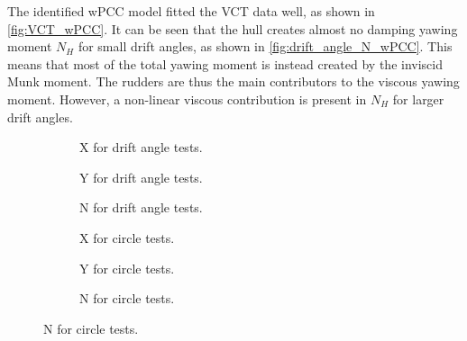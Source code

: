 The identified wPCC model fitted the VCT data well, as shown in \autoref{fig:VCT_wPCC}. 
It can be seen that the hull creates almost no damping yawing moment $N_H$ for small drift angles, as shown in \autoref{fig:drift_angle_N_wPCC}. This means that most of the total yawing moment is instead created by the inviscid Munk moment. The rudders are thus the main contributors to the viscous yawing moment. However, a non-linear viscous contribution is present in $N_H$ for larger drift angles. 
\begin{figure}[H]
     \centering
     \begin{subfigure}[b]{0.32\textwidth}
         \centering
        
        \caption{X for drift angle tests.}
        \label{fig:drift_angle_X_wPCC}
     \end{subfigure}
     \hfill
     \begin{subfigure}[b]{0.32\textwidth}
         \centering
         
        \caption{Y for drift angle tests.}
        \label{fig:drift_angle_Y_wPCC}
     \end{subfigure}
     \hfill
     \begin{subfigure}[b]{0.32\textwidth}
         \centering
         
        \caption{N for drift angle tests.}
        \label{fig:drift_angle_N_wPCC}
     \end{subfigure}
    \vfill
    
     \begin{subfigure}[b]{0.32\textwidth}
         \centering
         
        \caption{X for circle tests.}
        \label{fig:circle_X_wPCC}
     \end{subfigure}
     \hfill
     \begin{subfigure}[b]{0.32\textwidth}
         \centering
         
        \caption{Y for circle tests.}
        \label{fig:circle_Y_wPCC}
     \end{subfigure}
     \hfill
     \begin{subfigure}[b]{0.32\textwidth}
         \centering
         
        \caption{N for circle tests.}
        \label{fig:circle_N_wPCC}
     \end{subfigure}


\end{figure}
